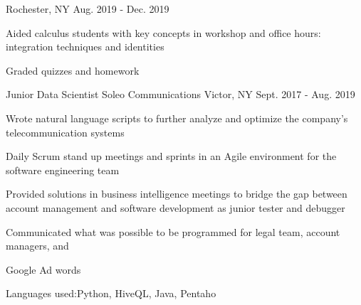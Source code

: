 \begin{cventries}
    {Rochester, NY}
    {Aug. 2019 - Dec. 2019}
    {
      \begin{cvitems}
        \item {Aided calculus students with key concepts in workshop and office hours: integration techniques and identities}
        \item {Graded quizzes and homework}
      \end{cvitems}
    }
  \cventry
    {Junior Data Scientist}
    {Soleo Communications}
    {Victor, NY}
    {Sept. 2017 - Aug. 2019}
    {
      \begin{cvitems}
        \item {Wrote natural language scripts to further analyze and optimize the company's telecommunication systems}
        \item {Daily Scrum stand up meetings and sprints in an Agile environment for the software engineering team}
        \item {Provided solutions in business intelligence meetings to bridge the gap between account management and software development as junior tester and debugger}
        \item{Communicated what was possible to be programmed for legal team, account managers, and }
        \item{Google Ad words}
        \item{Languages used:Python, HiveQL, Java, Pentaho}
      \end{cvitems}
    }


\end{cventries}
